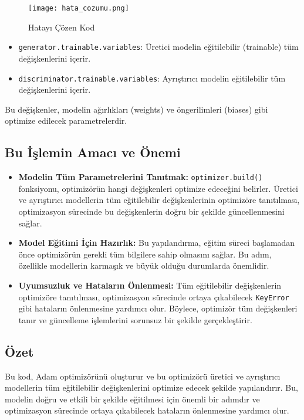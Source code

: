 \documentclass[10pt]{article}
\begin{document}
	\begin{figure}[htbp]
		\centering
		\texttt{[image: hata\_cozumu.png]}
		\caption{Hatayı Çözen Kod \cite{gan_hata}}
		\label{fig:hata_cozumu}
	\end{figure}
	
	\begin{itemize}
		\item \texttt{generator.trainable.variables}: Üretici modelin eğitilebilir (trainable) tüm değişkenlerini içerir.
		\item \texttt{discriminator.trainable.variables}: Ayrıştırıcı modelin eğitilebilir tüm değişkenlerini içerir.
	\end{itemize}
	
	Bu değişkenler, modelin ağırlıkları (weights) ve öngerilimleri (biases) gibi optimize edilecek parametrelerdir.
	
	\subsection{Bu İşlemin Amacı ve Önemi}
	\begin{itemize}
		\item \textbf{Modelin Tüm Parametrelerini Tanıtmak:} \texttt{optimizer.build()} fonksiyonu, optimizörün hangi değişkenleri optimize edeceğini belirler. Üretici ve ayrıştırıcı modellerin tüm eğitilebilir değişkenlerinin optimizöre tanıtılması, optimizasyon sürecinde bu değişkenlerin doğru bir şekilde güncellenmesini sağlar.
		\item \textbf{Model Eğitimi İçin Hazırlık:} Bu yapılandırma, eğitim süreci başlamadan önce optimizörün gerekli tüm bilgilere sahip olmasını sağlar. Bu adım, özellikle modellerin karmaşık ve büyük olduğu durumlarda önemlidir.
		\item \textbf{Uyumsuzluk ve Hataların Önlenmesi:} Tüm eğitilebilir değişkenlerin optimizöre tanıtılması, optimizasyon sürecinde ortaya çıkabilecek \texttt{KeyError} gibi hataların önlenmesine yardımcı olur. Böylece, optimizör tüm değişkenleri tanır ve güncelleme işlemlerini sorunsuz bir şekilde gerçekleştirir.
	\end{itemize}
	
	\subsection{Özet}
	Bu kod, Adam optimizörünü oluşturur ve bu optimizörü üretici ve ayrıştırıcı modellerin tüm eğitilebilir değişkenlerini optimize edecek şekilde yapılandırır. Bu, modelin doğru ve etkili bir şekilde eğitilmesi için önemli bir adımdır ve optimizasyon sürecinde ortaya çıkabilecek hataların önlenmesine yardımcı olur.
	
\end{document}
